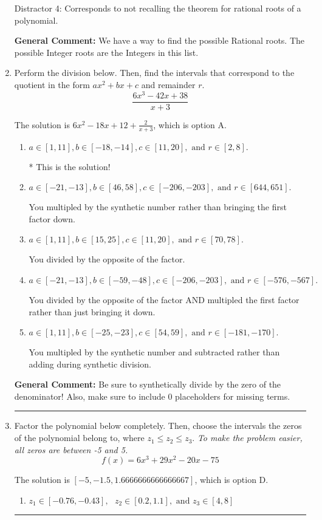 \documentclass{extbook}[14pt]
\newcommand{\litem}[1]{\item #1

\rule{\textwidth}{0.4pt}}
\begin{document}
\begin{enumerate}
{\begin{enumerate}[label=\Alph*.]
 Distractor 4: Corresponds to not recalling the theorem for rational roots of a polynomial.
\end{enumerate}

\textbf{General Comment:} We have a way to find the possible Rational roots. The possible Integer roots are the Integers in this list.
}
\litem{
Perform the division below. Then, find the intervals that correspond to the quotient in the form $ax^2+bx+c$ and remainder $r$.
\[ \frac{6x^{3} -42 x + 38}{x + 3} \]

The solution is \( 6x^{2} -18 x + 12 + \frac{2}{x + 3} \), which is option A.\begin{enumerate}[label=\Alph*.]
\item \( a \in [1, 11], b \in [-18, -14], c \in [11, 20], \text{ and } r \in [2, 8]. \)

* This is the solution!
\item \( a \in [-21, -13], b \in [46, 58], c \in [-206, -203], \text{ and } r \in [644, 651]. \)

 You multipled by the synthetic number rather than bringing the first factor down.
\item \( a \in [1, 11], b \in [15, 25], c \in [11, 20], \text{ and } r \in [70, 78]. \)

 You divided by the opposite of the factor.
\item \( a \in [-21, -13], b \in [-59, -48], c \in [-206, -203], \text{ and } r \in [-576, -567]. \)

 You divided by the opposite of the factor AND multipled the first factor rather than just bringing it down.
\item \( a \in [1, 11], b \in [-25, -23], c \in [54, 59], \text{ and } r \in [-181, -170]. \)

 You multipled by the synthetic number and subtracted rather than adding during synthetic division.
\end{enumerate}

\textbf{General Comment:} Be sure to synthetically divide by the zero of the denominator! Also, make sure to include 0 placeholders for missing terms.
}
\litem{
Factor the polynomial below completely. Then, choose the intervals the zeros of the polynomial belong to, where $z_1 \leq z_2 \leq z_3$. \textit{To make the problem easier, all zeros are between -5 and 5.}
\[ f(x) = 6x^{3} +29 x^{2} -20 x -75 \]

The solution is \( [-5, -1.5, 1.6666666666666667] \), which is option D.\begin{enumerate}[label=\Alph*.]
\item \( z_1 \in [-0.76, -0.43], \text{   }  z_2 \in [0.2, 1.1], \text{   and   } z_3 \in [4, 8] \)


\end{enumerate}}
\end{enumerate}
\end{document}
